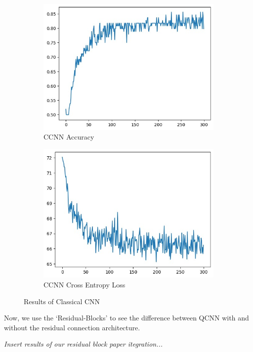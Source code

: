 \documentclass[a4paper]{article}
\begin{document}
\begin{figure}[h]
\centering
\begin{subfigure}{.5\textwidth}
  \centering
  \includegraphics[height=0.7\linewidth]{assets/accu.jpeg}
  \caption{CCNN Accuracy}
  \label{fig:sub1}
\end{subfigure}%
\begin{subfigure}{.5\textwidth}
  \centering
  \includegraphics[height=.7\linewidth]{assets/cf.jpeg}
  \caption{CCNN Cross Entropy Loss}
  \label{fig:sub2}
\end{subfigure}%
\caption{Results of Classical CNN}
\label{fig:test}
\end{figure}
Now, we use the `Residual-Blocks' to see the difference between QCNN with and without the residual connection architecture.

\emph{Insert results of our residual block paper itegration...}
\end{document}
